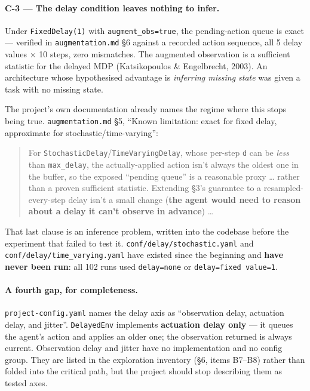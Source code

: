 \documentclass[11pt]{article}
\newcommand{\code}[1]{\texttt{\small #1}}
\begin{document}
\paragraph{C-3 --- The delay condition leaves nothing to infer.} Under \code{FixedDelay(1)} with \code{augment\_obs=true}, the pending-action queue is exact --- verified in \code{augmentation.md} \S6 against a recorded action sequence, all 5 delay values $\times$ 10 steps, zero mismatches. The augmented observation is a sufficient statistic for the delayed MDP (Katsikopoulos \& Engelbrecht, 2003). An architecture whose hypothesised advantage is \emph{inferring missing state} was given a task with no missing state.

The project's own documentation already names the regime where this stops being true. \code{augmentation.md} \S5, ``Known limitation: exact for fixed delay, approximate for stochastic/time-varying'':

\begin{quote}\small
For \code{StochasticDelay}/\code{TimeVaryingDelay}, whose per-step \code{d} can be \emph{less} than \code{max\_delay}, the actually-applied action isn't always the oldest one in the buffer, so the exposed ``pending queue'' is a reasonable proxy \dots{} rather than a proven sufficient statistic. Extending \S3's guarantee to a resampled-every-step delay isn't a small change (\textbf{the agent would need to reason about a delay it can't observe in advance}) \dots
\end{quote}

That last clause is an inference problem, written into the codebase before the experiment that failed to test it. \code{conf/delay/stochastic.yaml} and \code{conf/delay/time\_varying.yaml} have existed since the beginning and \textbf{have never been run}: all 102 runs used \code{delay=none} or \code{delay=fixed value=1}.

\paragraph{A fourth gap, for completeness.} \code{project-config.yaml} names the delay axis as ``observation delay, actuation delay, and jitter''. \code{DelayedEnv} implements \textbf{actuation delay only} --- it queues the agent's action and applies an older one; the observation returned is always current. Observation delay and jitter have no implementation and no config group. They are listed in the exploration inventory (\S6, items B7--B8) rather than folded into the critical path, but the project should stop describing them as tested axes.
\end{document}
